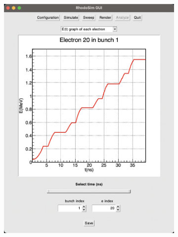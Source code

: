 \documentclass[a4paper,oneside,12pt]{report}
\numberwithin{equation}{chapter}
\begin{document}
\begin{figure}
    \centering
    \captionsetup{justification=centering}
    \begin{subfigure}{0.8\textwidth}
        \centering
        \includegraphics[width=\linewidth]{./figures/rhodoSim/GUI_analyze_Et_1.png}
    \end{subfigure} 
    \begin{subfigure}{0.8\textwidth}
        \centering

\end{subfigure}
\end{figure}
\end{document}
